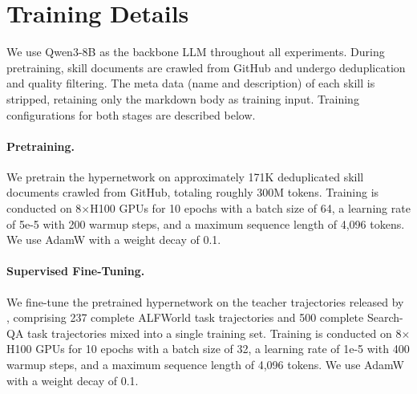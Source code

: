 \section{Training Details}
\label{app:training}

We use Qwen3-8B \citep{Yang2025Qwen3} as the backbone LLM throughout all experiments. During pretraining, skill documents are crawled from GitHub and undergo deduplication and quality filtering. The meta data (name and description) of each skill is stripped, retaining only the markdown body as training input. Training configurations for both stages are described below.


\paragraph{Pretraining.} We pretrain the hypernetwork on approximately 171K deduplicated skill documents crawled from GitHub, totaling roughly 300M tokens. Training is conducted on 8$\times$H100 GPUs for 10 epochs with a batch size of 64, a learning rate of 5e-5 with 200 warmup steps, and a maximum sequence length of 4,096 tokens. We use AdamW with a weight decay of 0.1.

\paragraph{Supervised Fine-Tuning.} We fine-tune the pretrained hypernetwork on the teacher trajectories released by \citet{Xia2026SkillRL}, comprising 237 complete ALFWorld task trajectories and 500 complete Search-QA task trajectories mixed into a single training set. Training is conducted on 8$\times$H100 GPUs for 10 epochs with a batch size of 32, a learning rate of 1e-5 with 400 warmup steps, and a maximum sequence length of 4,096 tokens. We use AdamW with a weight decay of 0.1.

